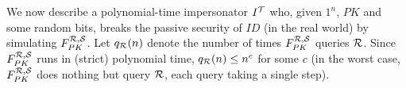 
We now describe a polynomial-time impersonator $I^{\mathcal{T}}$ who, given $1^n$,
$PK$ and some random bits, breaks the passive security of $ID$ (in the real
world) by simulating $F^{\mathcal{R},\mathcal{S}}_{PK}$.
Let $q_{\mathcal{R}}(n)$ denote the number of times $F^{\mathcal{R},\mathcal{S}}_{PK}$ queries
$\mathcal{R}$. Since $F^{\mathcal{R},\mathcal{S}}_{PK}$ runs in (strict) polynomial time,
$q_{\mathcal{R}}(n) \leq n^c$ for some $c$ (in the worst case, $F^{\mathcal{R},\mathcal{S}}_{PK}$
does nothing but query $\mathcal{R}$, each query taking a single step).

